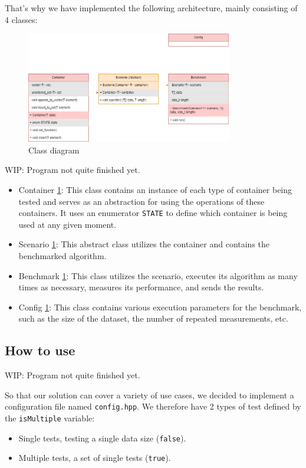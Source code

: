 \documentclass[conference]{IEEEtran}
\def\code#1{\texttt{#1}}
\begin{document}
That's why we have implemented the following architecture, mainly consisting of 4 classes:

\begin{figure}[!h]
	\includegraphics[width=9cm]{Diagram/architecture.png}
	\caption{Class diagram}
	\label{class diagram}
\end{figure}

WIP: Program not quite finished yet.

\begin{itemize}
	\item Container \ref{class diagram}: This class contains an instance of each type of container being tested and serves as an abstraction for using the operations of these containers. It uses an enumerator \code{STATE} to define which container is being used at any given moment.
	\item Scenario \ref{class diagram}: This abstract class utilizes the container and contains the benchmarked algorithm.
	\item Benchmark \ref{class diagram}: This class utilizes the scenario, executes its algorithm as many times as necessary, measures its performance, and sends the results.
	\item Config \ref{class diagram}: This class contains various execution parameters for the benchmark, such as the size of the dataset, the number of repeated measurements, etc.
\end{itemize}

\subsection{How to use}

WIP: Program not quite finished yet.

So that our solution can cover a variety of use cases, we decided to implement a configuration file named \code{config.hpp}.
We therefore have 2 types of test defined by the \code{isMultiple} variable:
\begin{itemize}
	\item Single tests, testing a single data size (\code{false}).
	\item Multiple tests, a set of single tests (\code{true}).
\end{itemize}
\end{document}
